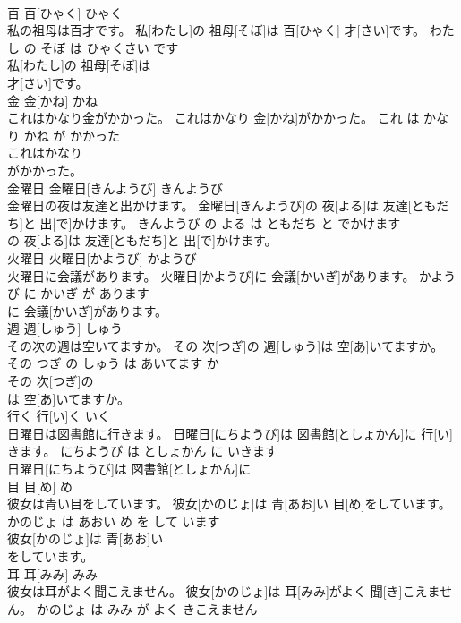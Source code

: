 \documentclass[8pt]{extreport}
\begin{document}
\begin{CJK}{UTF8}{min}
\\	百	百[ひゃく]	ひゃく	
\\	私の祖母は百才です。	私[わたし]の 祖母[そぼ]は 百[ひゃく] 才[さい]です。	わたし の そぼ は ひゃくさい です	
\\	私[わたし]の 祖母[そぼ]は
\\	才[さい]です。			
\\	金	金[かね]	かね	
\\	これはかなり金がかかった。	これはかなり 金[かね]がかかった。	これ は かなり かね が かかった	
\\	これはかなり
\\	がかかった。			
\\	金曜日	金曜日[きんようび]	きんようび	
\\	金曜日の夜は友達と出かけます。	金曜日[きんようび]の 夜[よる]は 友達[ともだち]と 出[で]かけます。	きんようび の よる は ともだち と でかけます	
\\	の 夜[よる]は 友達[ともだち]と 出[で]かけます。			
\\	火曜日	火曜日[かようび]	かようび	
\\	火曜日に会議があります。	火曜日[かようび]に 会議[かいぎ]があります。	かようび に かいぎ が あります	
\\	に 会議[かいぎ]があります。			
\\	週	週[しゅう]	しゅう	
\\	その次の週は空いてますか。	その 次[つぎ]の 週[しゅう]は 空[あ]いてますか。	その つぎ の しゅう は あいてます か	
\\	その 次[つぎ]の
\\	は 空[あ]いてますか。			
\\	行く	行[い]く	いく	
\\	日曜日は図書館に行きます。	日曜日[にちようび]は 図書館[としょかん]に 行[い]きます。	にちようび は としょかん に いきます	
\\	日曜日[にちようび]は 図書館[としょかん]に
\\	目	目[め]	め	
\\	彼女は青い目をしています。	彼女[かのじょ]は 青[あお]い 目[め]をしています。	かのじょ は あおい め を して います	
\\	彼女[かのじょ]は 青[あお]い
\\	をしています。			
\\	耳	耳[みみ]	みみ	
\\	彼女は耳がよく聞こえません。	彼女[かのじょ]は 耳[みみ]がよく 聞[き]こえません。	かのじょ は みみ が よく きこえません	

\end{CJK}
\end{document}
